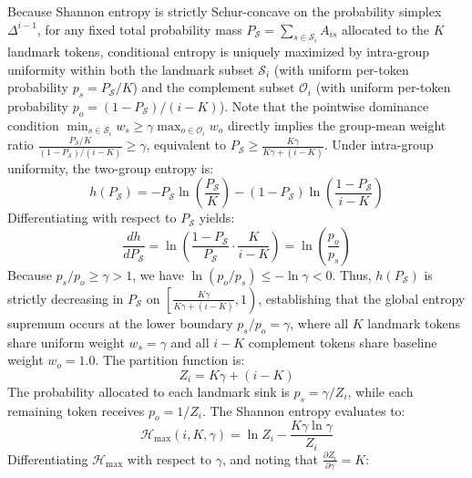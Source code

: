 \documentclass[conference,10pt]{IEEEtran}
\begin{document}
\begin{IEEEproof}
Because Shannon entropy is strictly Schur-concave on the probability simplex $\Delta^{i-1}$, for any fixed total probability mass $P_{\mathcal{S}} = \sum_{s \in \mathcal{S}_i} A_{is}$ allocated to the $K$ landmark tokens, conditional entropy is uniquely maximized by intra-group uniformity within both the landmark subset $\mathcal{S}_i$ (with uniform per-token probability $p_s = P_{\mathcal{S}}/K$) and the complement subset $\mathcal{O}_i$ (with uniform per-token probability $p_o = (1 - P_{\mathcal{S}})/(i - K)$). Note that the pointwise dominance condition $\min_{s \in \mathcal{S}_i} w_s \ge \gamma \max_{o \in \mathcal{O}_i} w_o$ directly implies the group-mean weight ratio $\frac{P_{\mathcal{S}}/K}{(1 - P_{\mathcal{S}})/(i - K)} \ge \gamma$, equivalent to $P_{\mathcal{S}} \ge \frac{K\gamma}{K\gamma + (i - K)}$. Under intra-group uniformity, the two-group entropy is:
\begin{equation}
h(P_{\mathcal{S}}) = - P_{\mathcal{S}} \ln\left(\frac{P_{\mathcal{S}}}{K}\right) - (1 - P_{\mathcal{S}}) \ln\left(\frac{1 - P_{\mathcal{S}}}{i - K}\right)
\end{equation}
Differentiating with respect to $P_{\mathcal{S}}$ yields:
\begin{equation}
\frac{dh}{dP_{\mathcal{S}}} = \ln\left( \frac{1 - P_{\mathcal{S}}}{P_{\mathcal{S}}} \cdot \frac{K}{i - K} \right) = \ln\left(\frac{p_o}{p_s}\right)
\end{equation}
Because $p_s / p_o \ge \gamma > 1$, we have $\ln(p_o / p_s) \le -\ln\gamma < 0$. Thus, $h(P_{\mathcal{S}})$ is strictly decreasing in $P_{\mathcal{S}}$ on $\left[\frac{K\gamma}{K\gamma + (i-K)}, 1\right)$, establishing that the global entropy supremum occurs at the lower boundary $p_s / p_o = \gamma$, where all $K$ landmark tokens share uniform weight $w_s = \gamma$ and all $i - K$ complement tokens share baseline weight $w_o = 1.0$. The partition function is:
\begin{equation}
\label{eq:partition_z}
Z_i = K\gamma + (i - K)
\end{equation}
The probability allocated to each landmark sink is $p_s = \gamma/Z_i$, while each remaining token receives $p_o = 1/Z_i$. The Shannon entropy evaluates to:
\begin{equation}
\label{eq:entropy_derivation}
\mathcal{H}_{\max}(i, K, \gamma) = \ln Z_i - \frac{K\gamma \ln\gamma}{Z_i}
\end{equation}
Differentiating $\mathcal{H}_{\max}$ with respect to $\gamma$, and noting that $\frac{\partial Z_i}{\partial\gamma} = K$:

\end{IEEEproof}
\end{document}
